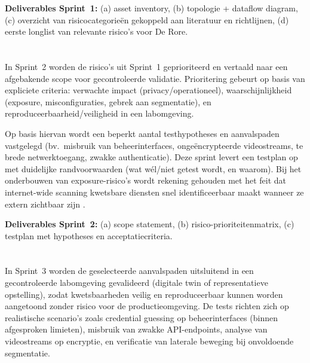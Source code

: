 \textbf{Deliverables Sprint~1:} (a) asset inventory, (b) topologie + dataflow diagram, (c) overzicht van risicocategorieën gekoppeld aan literatuur en richtlijnen, (d) eerste longlist van relevante risico’s voor De Rore.

\section{}%
\label{sec:meth-sprint2}

In Sprint~2 worden de risico’s uit Sprint~1 geprioriteerd en vertaald naar een afgebakende scope voor gecontroleerde validatie. Prioritering gebeurt op basis van expliciete criteria: verwachte impact (privacy/operationeel), waarschijnlijkheid (exposure, misconfiguraties, gebrek aan segmentatie), en reproduceerbaarheid/veiligheid in een labomgeving.

Op basis hiervan wordt een beperkt aantal testhypotheses en aanvalspaden vastgelegd (bv.\ misbruik van beheerinterfaces, ongeëncrypteerde videostreams, te brede netwerktoegang, zwakke authenticatie). Deze sprint levert een testplan op met duidelijke randvoorwaarden (wat wél/niet getest wordt, en waarom). Bij het onderbouwen van exposure-risico’s wordt rekening gehouden met het feit dat internet-wide scanning kwetsbare diensten snel identificeerbaar maakt wanneer ze extern zichtbaar zijn \autocite{durumeric2014internet}.

\textbf{Deliverables Sprint~2:} (a) scope statement, (b) risico-prioriteitenmatrix, (c) testplan met hypotheses en acceptatiecriteria.

\section{}%
\label{sec:meth-sprint3}

In Sprint~3 worden de geselecteerde aanvalspaden uitsluitend in een gecontroleerde labomgeving gevalideerd (digitale twin of representatieve opstelling), zodat kwetsbaarheden veilig en reproduceerbaar kunnen worden aangetoond zonder risico voor de productieomgeving. De tests richten zich op realistische scenario’s zoals credential guessing op beheerinterfaces (binnen afgesproken limieten), misbruik van zwakke API-endpoints, analyse van videostreams op encryptie, en verificatie van laterale beweging bij onvoldoende segmentatie.

